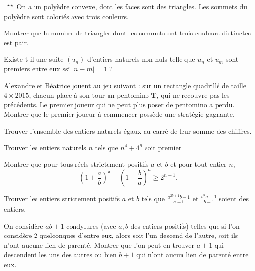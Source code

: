 \begin{exo}{ \mbox{ }$^ {\star \star}$}
On a un polyèdre convexe, dont les faces sont des triangles. Les sommets
du polyèdre sont coloriés
avec trois couleurs.

\smallskip

Montrer que le nombre de triangles dont les sommets ont trois couleurs
distinctes est pair.
\end{exo}

\begin{exo}{}
 Existe-t-il une
suite $\left(u_{n}\right)$ d'entiers naturels non nuls telle que
$u_{n}$ et $u_{m}$ sont premiers entre eux ssi $\left|n-m\right|=1$
?
\end{exo}

\begin{exo}{}  Alexandre et Béatrice jouent au jeu suivant
: sur un rectangle quadrillé de taille $4\times2015$, chacun place
à son tour un pentomino $\mathbf{T}$, qui ne recouvre pas les précédents.
Le premier joueur qui ne peut plus poser de pentomino a perdu. Montrer
que le premier joueur à commencer possède une stratégie gagnante.
\end{exo}

\begin{exo}{}Trouver l'ensemble des entiers naturels égaux au carré de leur somme des chiffres. 
\end{exo}

\begin{exo}{}Trouver les entiers naturels $n$ tels que $n^4+4^n$ soit premier. 
\end{exo}

\begin{exo}{}Montrer que pour tous réels strictement positifs $a$ et $b$ et pour tout entier $n$,
\[\left(1+\frac{a}{b}\right)^n+\left(1+\frac{b}{a}\right)^n \geq 2^{n+1}.\]
\end{exo}

\begin{exo}{}
Trouver les entiers strictement positifs $a$ et $b$ tels que
$\frac{a^{2b+1} b-1}{a+1}$ et $\frac{b^a a+1}{b-1}$ soient des
entiers.
\end{exo}

\begin{exo}{}
On considère $ab+1$ condylures (avec $a,b$ des entiers positifs) telles que si l'on considère $2$ quelconques d'entre eux, alors soit l'un descend de l'autre, soit ils n'ont aucune lien de parenté. Montrer que l'on peut en trouver $a+1$ qui descendent les uns des autres ou bien $b+1$ qui n'ont aucun lien de parenté entre eux.
\end{exo}


